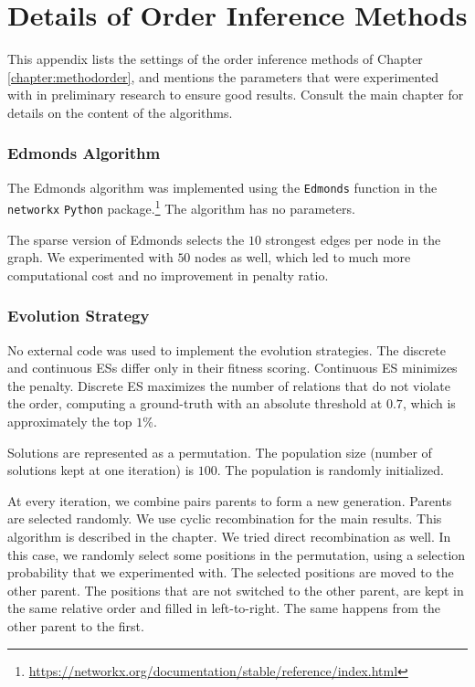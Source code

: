 \newpage
\section{Details of Order Inference Methods}
\label{appendix:order}

This appendix lists the settings of the order inference methods of Chapter \ref{chapter:methodorder}, and mentions the parameters that were experimented with in preliminary research to ensure good results. Consult the main chapter for details on the content of the algorithms.

\subsubsection{Edmonds Algorithm}

The Edmonds algorithm was implemented using the \texttt{Edmonds} function in the \texttt{networkx} \texttt{Python} package.\footnote{\href{https://networkx.org/documentation/stable/reference/index.html}{https://networkx.org/documentation/stable/reference/index.html}} The algorithm has no parameters.

The sparse version of Edmonds selects the $10$ strongest edges per node in the graph. We experimented with $50$ nodes as well, which led to much more computational cost and no improvement in penalty ratio.


\subsubsection{Evolution Strategy}

No external code was used to implement the evolution strategies. The discrete and continuous ESs differ only in their fitness scoring. Continuous ES minimizes the penalty. Discrete ES maximizes the number of relations that do not violate the order, computing a ground-truth with an absolute threshold at $0.7$, which is approximately the top $1\%$.

Solutions are represented as a permutation. The population size (number of solutions kept at one iteration) is $100$. The population is randomly initialized. 

At every iteration, we combine pairs parents to form a new generation. Parents are selected randomly. We use cyclic recombination for the main results. This algorithm is described in the chapter. We tried direct recombination as well. In this case, we randomly select some positions in the permutation, using a selection probability that we experimented with. The selected positions are moved to the other parent. The positions that are not switched to the other parent, are kept in the same relative order and filled in left-to-right. The same happens from the other parent to the first.

